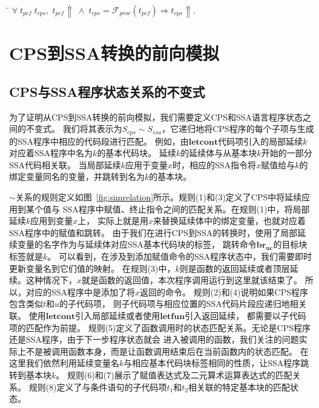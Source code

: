   \begin{theorem}[CPS程序对PCF程序发散行为的保存]\label{trm:cpsbhvpd}
    \begin{tabbing}
      \\
    \quad\=\kill
    \>$\forall \; t_{pcf}\; t_{cps},\; t_{pcf}\Uparrow\; \wedge \; t_{cps}=\mathcal{F}_{proc}(t_{pcf})\Longrightarrow t_{cps}\Uparrow.$
    \end{tabbing}
  \end{theorem}


\section{CPS到SSA转换的前向模拟} \label{sec:cpsssaforward}

\subsection{CPS与SSA程序状态关系的不变式}

为了证明从CPS到SSA转换的前向模拟，我们需要定义CPS和SSA语言程序状态之间的不变式。
我们将其表示为$S_{cps} \sim S_{ssa}$，它递归地将CPS程序的每个子项与生成的SSA程序中相应的代码段进行匹配。
例如，由$\mathbf{letcont}$代码项引入的局部延续$k$对应着SSA程序中名为$k$的基本代码块。
延续$k$的延续体与从基本块$k$开始的一部分SSA代码相关联。
当局部延续$k$应用于变量$x$时，相应的SSA指令将$x$赋值给与$k$的绑定变量同名的变量，并跳转到名为$k$的基本块。

$\sim$关系的规则定义如图~\ref{fig:simrelation}所示。规则(1)和(3)定义了CPS中将延续应用到某个值与
SSA程序中赋值、终止指令之间的匹配关系。在规则(1)中，将局部延续$k$应用到变量$x$上，
实际上就是用$x$来替换延续体中的绑定变量，也就对应着SSA程序中的赋值和跳转。
由于我们在进行CPS到SSA的转换时，使用了局部延续变量的名字作为与延续体对应SSA基本代码块的标签，
跳转命令$\mathbf{br_{uc}}$的目标块标签就是$k$。
可以看到，在涉及到添加赋值命令的SSA程序状态中，我们需要即时更新变量名到它们值的映射。
在规则(3)中，$k$则是函数的返回延续或者顶层延续。这种情况下，$x$就是函数的返回值，本次程序调用运行到这里就该结束了。
所以，对应的SSA程序中是添加了将$x$返回的命令。
规则(2)和(4)说明如果CPS程序包含类似$t$和$u$的子代码项，
则子代码项与相应位置的SSA代码片段应递归地相关联。
使用$\mathbf{letcont}$引入局部延续或者使用$\mathbf{letfun}$引入返回延续，
都需要以子代码项的匹配作为前提。
规则(5)定义了函数调用时的状态匹配关系。无论是CPS程序还是SSA程序，由于下一步程序状态就会
进入被调用的函数，我们关注的问题实际上不是被调用函数本身，而是让函数调用结束后在当前函数内的状态匹配。
在这里我们依然利用延续变量名$k$与相应基本代码块标签相同的性质，让SSA程序跳转到基本块$k$。
规则(6)和(7)展示了赋值表达式及二元算术运算表达式的匹配关系。
规则(8)定义了与条件语句的子代码项$t_1$和$t_2$相关联的特定基本块的匹配状态。

